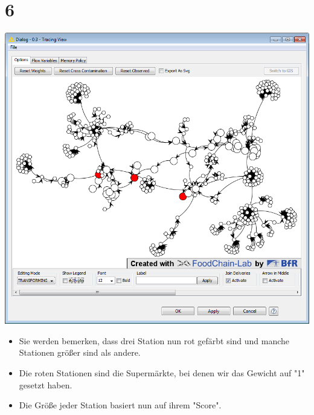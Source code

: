 \documentclass{beamer}
\begin{document}
\section{6}
\begin{frame}
	\begin{center}
  		\includegraphics[height=0.6\textheight]{6.png}
	\end{center}
	\begin{itemize}
		\item Sie werden bemerken, dass drei Station nun rot gefärbt sind und manche Stationen größer sind als andere.
		\item Die roten Stationen sind die Supermärkte, bei denen wir das Gewicht auf "1" gesetzt haben.
		\item Die Größe jeder Station basiert nun auf ihrem "Score".
	\end{itemize}
\end{frame}
\end{document}
